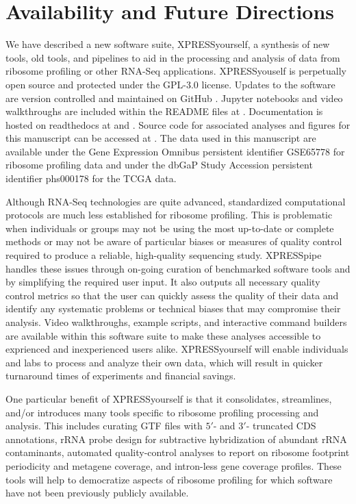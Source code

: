 \documentclass[10pt, oneside]{article}
\begin{document}
\section*{Availability and Future Directions}
We have described a new software suite, XPRESSyourself, a synthesis of new tools, old tools, and pipelines to aid in the processing and analysis of data from ribosome profiling or other RNA-Seq applications. XPRESSyouself is perpetually open source and protected under the GPL-3.0 license. Updates to the software are version controlled and maintained on GitHub \cite{xpressyourself}. Jupyter notebooks and video walkthroughs are included within the README files at \cite{xpressyourself}. Documentation is hosted on readthedocs \cite{readthedocs} at \cite{xpresspipe_docs} and \cite{xpressplot_docs}. Source code for associated analyses and figures for this manuscript can be accessed at \cite{manuscript}. The data used in this manuscript are available under the Gene Expression Omnibus persistent identifier GSE65778 \cite{isrib_geo} for ribosome profiling data and under the dbGaP Study Accession persistent identifier phs000178 \cite{tcga_data} for the TCGA data. \par

Although RNA-Seq technologies are quite advanced, standardized computational protocols are much less established for ribosome profiling. This is problematic when individuals or groups may not be using the most up-to-date or complete methods or may not be aware of particular biases or measures of quality control required to produce a reliable, high-quality sequencing study. XPRESSpipe handles these issues through on-going curation of benchmarked software tools and by simplifying the required user input. It also outputs all necessary quality control metrics so that the user can quickly assess the quality of their data and identify any systematic problems or technical biases that may compromise their analysis. Video walkthroughs, example scripts, and interactive command builders are available within this software suite to make these analyses accessible to exprienced and inexperienced users alike. XPRESSyourself will enable individuals and labs to process and analyze their own data, which will result in quicker turnaround times of experiments and financial savings.  \par

One particular benefit of XPRESSyourself is that it consolidates, streamlines, and/or introduces many tools specific to ribosome profiling processing and analysis. This includes curating GTF files with $5'$- and $3'$- truncated CDS annotations, rRNA probe design for subtractive hybridization of abundant rRNA contaminants, automated quality-control analyses to report on ribosome footprint periodicity and metagene coverage, and intron-less gene coverage profiles. These tools will help to democratize aspects of ribosome profiling for which software have not been previously publicly available. \par
\end{document}

